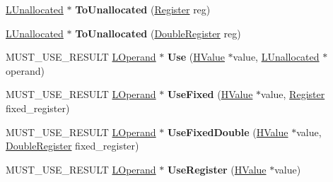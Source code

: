 \begin{DoxyCompactItemize}
\item 
\hyperlink{classv8_1_1internal_1_1_l_unallocated}{L\+Unallocated} $\ast$ {\bfseries To\+Unallocated} (\hyperlink{structv8_1_1internal_1_1_register}{Register} reg)\hypertarget{classv8_1_1internal_1_1_l_chunk_builder_ae996944c8e59f0e19fe2743090135cb9}{}\label{classv8_1_1internal_1_1_l_chunk_builder_ae996944c8e59f0e19fe2743090135cb9}

\item 
\hyperlink{classv8_1_1internal_1_1_l_unallocated}{L\+Unallocated} $\ast$ {\bfseries To\+Unallocated} (\hyperlink{structv8_1_1internal_1_1_double_register}{Double\+Register} reg)\hypertarget{classv8_1_1internal_1_1_l_chunk_builder_a427a5c234ee24a3cf1c3036069908e31}{}\label{classv8_1_1internal_1_1_l_chunk_builder_a427a5c234ee24a3cf1c3036069908e31}

\item 
M\+U\+S\+T\+\_\+\+U\+S\+E\+\_\+\+R\+E\+S\+U\+LT \hyperlink{classv8_1_1internal_1_1_l_operand}{L\+Operand} $\ast$ {\bfseries Use} (\hyperlink{classv8_1_1internal_1_1_h_value}{H\+Value} $\ast$value, \hyperlink{classv8_1_1internal_1_1_l_unallocated}{L\+Unallocated} $\ast$operand)\hypertarget{classv8_1_1internal_1_1_l_chunk_builder_accd60b3b89817c5ad33a2124e268e793}{}\label{classv8_1_1internal_1_1_l_chunk_builder_accd60b3b89817c5ad33a2124e268e793}

\item 
M\+U\+S\+T\+\_\+\+U\+S\+E\+\_\+\+R\+E\+S\+U\+LT \hyperlink{classv8_1_1internal_1_1_l_operand}{L\+Operand} $\ast$ {\bfseries Use\+Fixed} (\hyperlink{classv8_1_1internal_1_1_h_value}{H\+Value} $\ast$value, \hyperlink{structv8_1_1internal_1_1_register}{Register} fixed\+\_\+register)\hypertarget{classv8_1_1internal_1_1_l_chunk_builder_a61be80f9ab32bd10c228aad8844f63b7}{}\label{classv8_1_1internal_1_1_l_chunk_builder_a61be80f9ab32bd10c228aad8844f63b7}

\item 
M\+U\+S\+T\+\_\+\+U\+S\+E\+\_\+\+R\+E\+S\+U\+LT \hyperlink{classv8_1_1internal_1_1_l_operand}{L\+Operand} $\ast$ {\bfseries Use\+Fixed\+Double} (\hyperlink{classv8_1_1internal_1_1_h_value}{H\+Value} $\ast$value, \hyperlink{structv8_1_1internal_1_1_double_register}{Double\+Register} fixed\+\_\+register)\hypertarget{classv8_1_1internal_1_1_l_chunk_builder_a30223bb99ad69217597b53afef85c6c1}{}\label{classv8_1_1internal_1_1_l_chunk_builder_a30223bb99ad69217597b53afef85c6c1}

\item 
M\+U\+S\+T\+\_\+\+U\+S\+E\+\_\+\+R\+E\+S\+U\+LT \hyperlink{classv8_1_1internal_1_1_l_operand}{L\+Operand} $\ast$ {\bfseries Use\+Register} (\hyperlink{classv8_1_1internal_1_1_h_value}{H\+Value} $\ast$value)\hypertarget{classv8_1_1internal_1_1_l_chunk_builder_a71d4b11b7eca26df2551720af10eeb8d}{}\label{classv8_1_1internal_1_1_l_chunk_builder_a71d4b11b7eca26df2551720af10eeb8d}


\end{DoxyCompactItemize}

